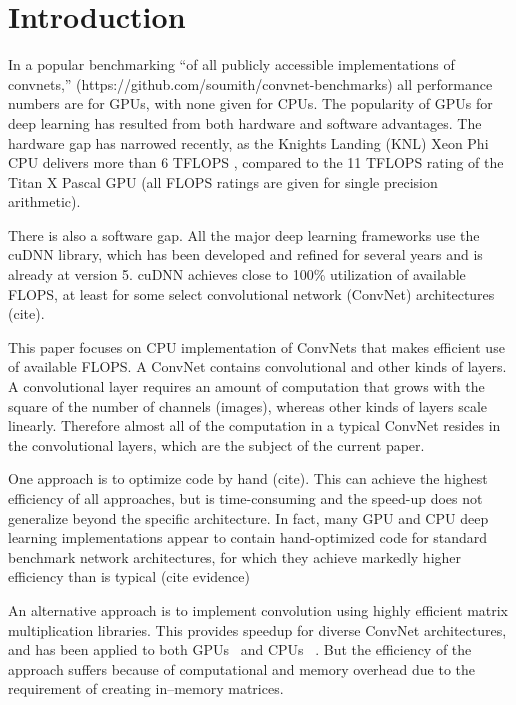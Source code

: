 \section{Introduction}

  In a popular benchmarking ``of all publicly accessible
  implementations of convnets,''
  (https://github.com/soumith/convnet-benchmarks) all performance
  numbers are for GPUs, with none given for CPUs.  The popularity of
  GPUs for deep learning has resulted from both hardware and software
  advantages.  The hardware gap has narrowed recently, as the Knights
  Landing (KNL) Xeon Phi CPU delivers more than 6 TFLOPS \cite{},
  compared to the 11 TFLOPS rating of the Titan X Pascal GPU (all
  FLOPS ratings are given for single precision arithmetic).

  There is also a software gap.  All the major deep learning
  frameworks use the cuDNN library, which has been developed and
  refined for several years and is already at version 5.  cuDNN
  achieves close to 100\% utilization of available FLOPS, at least for
  some select convolutional network (ConvNet) architectures (cite).

  This paper focuses on CPU implementation of ConvNets that makes
  efficient use of available FLOPS.  A ConvNet contains convolutional
  and other kinds of layers.  A convolutional layer requires an amount
  of computation that grows with the square of the number of channels
  (images), whereas other kinds of layers scale linearly.  Therefore
  almost all of the computation in a typical ConvNet resides in the
  convolutional layers, which are the subject of the current paper.

  One approach is to optimize code by hand (cite). This can achieve
  the highest efficiency of all approaches, but is time-consuming and
  the speed-up does not generalize beyond the specific architecture.
  In fact, many GPU and CPU deep learning implementations appear to
  contain hand-optimized code for standard benchmark network
  architectures, for which they achieve markedly higher efficiency
  than is typical (cite evidence)

  An alternative approach is to implement convolution using highly
  efficient matrix multiplication libraries.  This provides speedup
  for diverse ConvNet architectures, and has been applied to both
  GPUs~\cite{chetlur2014cudnn,neonnervana} and CPUs
  ~\cite{hadjis2015shallow}.  But the efficiency of the approach
  suffers because of computational and memory overhead due to the
  requirement of creating in--memory matrices.

